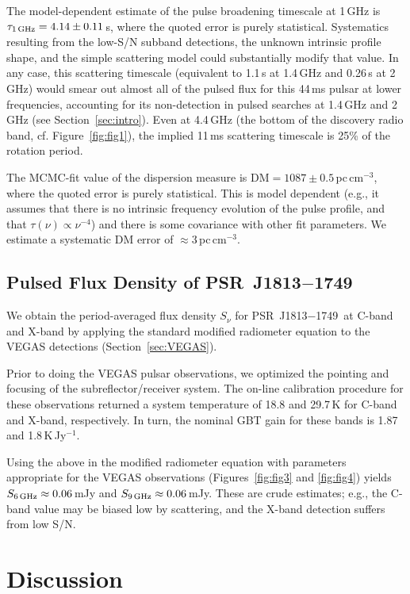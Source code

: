 \documentclass[twocolumn]{aastex62}
\newcommand\psr{PSR~J1813$-$1749}
\begin{document}
The model-dependent estimate of the pulse broadening timescale at
1\,GHz is $\tau_{\rm 1\,GHz} = 4.14\pm0.11$\,s, where the quoted
error is purely statistical. Systematics resulting from the low-S/N
subband detections, the unknown intrinsic profile shape, and the
simple scattering model could substantially modify that value.  In
any case, this scattering timescale (equivalent to 1.1\,s at 1.4\,GHz
and 0.26\,s at 2\,GHz) would smear out almost all of the pulsed
flux for this 44\,ms pulsar at lower frequencies, accounting for
its non-detection in pulsed searches at 1.4\,GHz and 2\,GHz (see
Section~\ref{sec:intro}). Even at 4.4\,GHz (the bottom of the
discovery radio band, cf. Figure~\ref{fig:fig1}), the implied 11\,ms
scattering timescale is 25\% of the rotation period.

The MCMC-fit value of the dispersion measure is $\mbox{DM} = 1087
\pm 0.5$\,pc\,cm$^{-3}$, where the quoted error is purely statistical.
This is model dependent (e.g., it assumes that there is no intrinsic
frequency evolution of the pulse profile, and that
$\tau(\nu)\propto\nu^{-4}$) and there is some covariance with other
fit parameters. We estimate a systematic DM error of $\approx
3$\,pc\,cm$^{-3}$.

\subsection{Pulsed Flux Density of \psr\ \label{sec:flux}}

We obtain the period-averaged flux density $S_\nu$ for \psr\ at
C-band and X-band by applying the standard modified radiometer
equation to the VEGAS detections (Section~\ref{sec:VEGAS}).

Prior to doing the VEGAS pulsar observations, we optimized the
pointing and focusing of the subreflector/receiver system. The
on-line calibration procedure for these observations returned a
system temperature of 18.8 and 29.7\,K for C-band and X-band,
respectively. In turn, the nominal GBT gain for these bands is 1.87
and 1.8\,K\,Jy$^{-1}$.

Using the above in the modified radiometer equation with parameters
appropriate for the VEGAS observations (Figures~\ref{fig:fig3} and
\ref{fig:fig4}) yields $S_{\rm 6\,GHz} \approx 0.06$\,mJy and
$S_{\rm 9\,GHz} \approx 0.06$\,mJy. These are crude estimates; e.g.,
the C-band value may be biased low by scattering, and the
X-band detection suffers from low S/N.

\section{Discussion}
\end{document}
